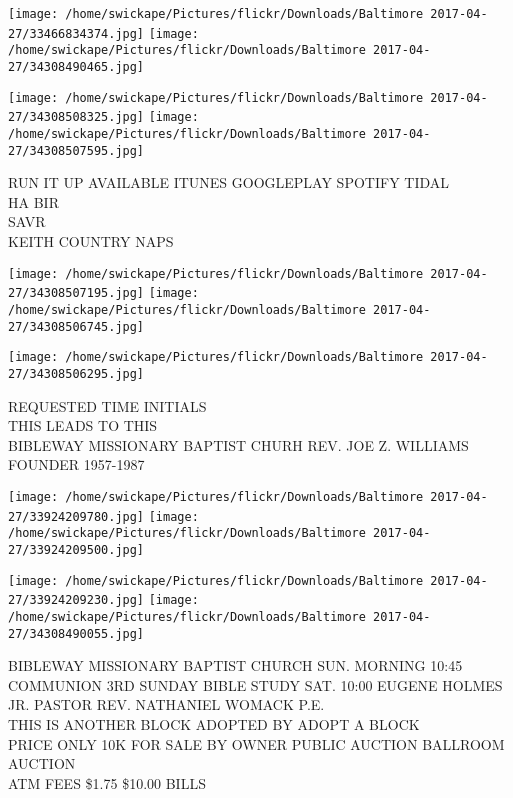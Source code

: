 \documentclass[10pt,letterpaper]{article}
\begin{document}
\texttt{[image: /home/swickape/Pictures/flickr/Downloads/Baltimore 2017-04-27/33466834374.jpg]}
\texttt{[image: /home/swickape/Pictures/flickr/Downloads/Baltimore 2017-04-27/34308490465.jpg]}

\texttt{[image: /home/swickape/Pictures/flickr/Downloads/Baltimore 2017-04-27/34308508325.jpg]}
\texttt{[image: /home/swickape/Pictures/flickr/Downloads/Baltimore 2017-04-27/34308507595.jpg]}

RUN IT UP AVAILABLE ITUNES GOOGLEPLAY SPOTIFY TIDAL\\
HA BIR\\
SAVR\\
KEITH COUNTRY NAPS\\
\pagebreak

\texttt{[image: /home/swickape/Pictures/flickr/Downloads/Baltimore 2017-04-27/34308507195.jpg]}
\texttt{[image: /home/swickape/Pictures/flickr/Downloads/Baltimore 2017-04-27/34308506745.jpg]}

\vspace{0.25in}
\texttt{[image: /home/swickape/Pictures/flickr/Downloads/Baltimore 2017-04-27/34308506295.jpg]}

REQUESTED TIME INITIALS\\
THIS LEADS TO THIS\\
BIBLEWAY MISSIONARY BAPTIST CHURH REV. JOE Z. WILLIAMS FOUNDER 1957{-}1987\\
\pagebreak

\texttt{[image: /home/swickape/Pictures/flickr/Downloads/Baltimore 2017-04-27/33924209780.jpg]}
\texttt{[image: /home/swickape/Pictures/flickr/Downloads/Baltimore 2017-04-27/33924209500.jpg]}

\texttt{[image: /home/swickape/Pictures/flickr/Downloads/Baltimore 2017-04-27/33924209230.jpg]}
\texttt{[image: /home/swickape/Pictures/flickr/Downloads/Baltimore 2017-04-27/34308490055.jpg]}

BIBLEWAY MISSIONARY BAPTIST CHURCH SUN. MORNING 10:45 COMMUNION 3RD SUNDAY BIBLE STUDY SAT. 10:00 EUGENE HOLMES JR. PASTOR REV. NATHANIEL WOMACK P.E.\\
THIS IS ANOTHER BLOCK ADOPTED BY ADOPT A BLOCK\\
PRICE ONLY 10K FOR SALE BY OWNER PUBLIC AUCTION BALLROOM AUCTION\\
ATM FEES \$1.75 \$10.00 BILLS\\
\pagebreak
\end{document}
